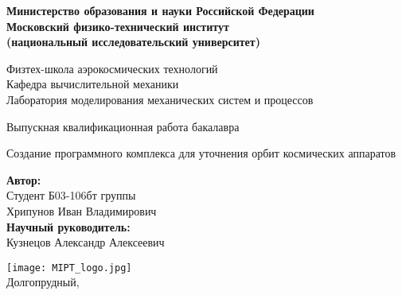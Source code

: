 \begin{center}
    \large\textbf{Министерство образования и науки Российской Федерации \\
    Московский физико-технический институт \\
    (национальный исследовательский университет)} \\
    \vspace{1cm}

    Физтех-школа аэрокосмических технологий \\

    Кафедра вычислительной механики \\
    Лаборатория моделирования механических систем и процессов\\

    \vspace{3em}

    Выпускная квалификационная работа бакалавра
\end{center}

\begin{center}
    \vspace{\fill}
    \LARGE{Создание программного комплекса для уточнения орбит космических аппаратов}

    \vspace{\fill}
\end{center}


\begin{flushright}
    \textbf{Автор:} \\
    Студент Б03-106бт группы \\
    Хрипунов Иван Владимирович \\
    \vspace{2em}
    \textbf{Научный руководитель:} \\
    Кузнецов Александр Алексеевич \\
    \vspace{2em}
\end{flushright}

\vspace{7em}

\begin{center}
    \texttt{[image: MIPT\_logo.jpg]}\\
    Долгопрудный, \the\year{}
\end{center}

\thispagestyle{empty}

\newpage
\setcounter{page}{2}
\fancyfoot[c]{\thepage}
\fancyhead[L]{}
\fancyhead[R]{}